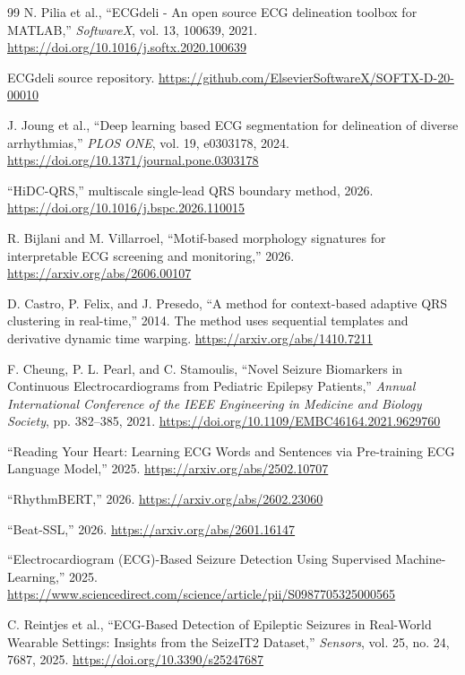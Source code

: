 \documentclass[11pt,a4paper]{article}
\begin{document}
\begin{thebibliography}{99}
N. Pilia et al., ``ECGdeli - An open source ECG delineation toolbox for MATLAB,'' \emph{SoftwareX}, vol. 13, 100639, 2021. \url{https://doi.org/10.1016/j.softx.2020.100639}

ECGdeli source repository. \url{https://github.com/ElsevierSoftwareX/SOFTX-D-20-00010}

J. Joung et al., ``Deep learning based ECG segmentation for delineation of diverse arrhythmias,'' \emph{PLOS ONE}, vol. 19, e0303178, 2024. \url{https://doi.org/10.1371/journal.pone.0303178}

``HiDC-QRS,'' multiscale single-lead QRS boundary method, 2026. \url{https://doi.org/10.1016/j.bspc.2026.110015}

R. Bijlani and M. Villarroel, ``Motif-based morphology signatures for interpretable ECG screening and monitoring,'' 2026. \url{https://arxiv.org/abs/2606.00107}

D. Castro, P. Felix, and J. Presedo, ``A method for context-based adaptive QRS clustering in real-time,'' 2014. The method uses sequential templates and derivative dynamic time warping. \url{https://arxiv.org/abs/1410.7211}

F. Cheung, P. L. Pearl, and C. Stamoulis, ``Novel Seizure Biomarkers in Continuous Electrocardiograms from Pediatric Epilepsy Patients,'' \emph{Annual International Conference of the IEEE Engineering in Medicine and Biology Society}, pp. 382--385, 2021. \url{https://doi.org/10.1109/EMBC46164.2021.9629760}

``Reading Your Heart: Learning ECG Words and Sentences via Pre-training ECG Language Model,'' 2025. \url{https://arxiv.org/abs/2502.10707}

``RhythmBERT,'' 2026. \url{https://arxiv.org/abs/2602.23060}

``Beat-SSL,'' 2026. \url{https://arxiv.org/abs/2601.16147}

``Electrocardiogram (ECG)-Based Seizure Detection Using Supervised Machine-Learning,'' 2025. \url{https://www.sciencedirect.com/science/article/pii/S0987705325000565}

C. Reintjes et al., ``ECG-Based Detection of Epileptic Seizures in Real-World Wearable Settings: Insights from the SeizeIT2 Dataset,'' \emph{Sensors}, vol. 25, no. 24, 7687, 2025. \url{https://doi.org/10.3390/s25247687}


\end{thebibliography}
\end{document}
